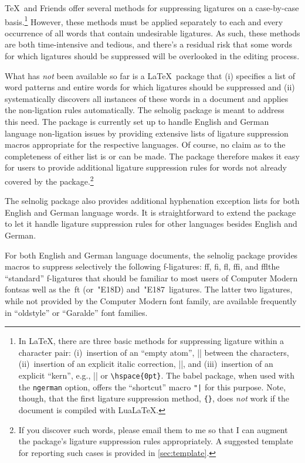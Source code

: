 \documentclass[12pt]{article}
\newcommand{\pkg}[1]{\textsf{#1}}
\newcommand{\opt}[1]{\texttt{#1}}
\begin{document}
\TeX\ and Friends offer several methods for suppressing ligatures on a case-by-case basis.\footnote{In \LaTeX, there are three basic methods for suppressing ligature within a character pair: (i)~insertion of an \enquote{empty atom}, |{}| between the characters, (ii)~insertion of an explicit italic correction, |\/|, and (iii)~insertion of an explicit \enquote{kern}, e.g., |\kern0pt| or \Verb/\hspace{0pt}/. The \pkg{babel} package, when used with the \opt{ngerman} option, offers the \enquote{shortcut} macro \Verb/"|/ for this purpose. Note, though, that the first ligature suppression method, \Verb/{}/, does \emph{not} work if the document is compiled with Lua\LaTeX.} However, these methods must be applied separately to each and every occurrence of all words that contain undesirable ligatures. As such, these methods are both time-intensive and tedious, and there's a residual risk that some words for which ligatures should be suppressed will be overlooked in the editing process. 

What has \emph{not} been available so far is a \LaTeX\ package that (i) specifies a list of word patterns and entire words for which ligatures should be suppressed and (ii) systematically discovers all instances of these words in a document and applies the non-ligation rules automatically. The \pkg{selnolig} package is meant to address this need. The package is currently set up to handle English and German language non-ligation issues by providing extensive lists of ligature suppression macros appropriate for the respective languages. Of course, no claim as to the completeness of either list is or can be made. The package therefore makes it easy for users to provide additional ligature suppression rules for words not already covered by the package.\footnote{If you discover such words, please email them to me so that I can augment the package's ligature suppression rules appropriately. A suggested template for reporting such cases is provided in \cref{sec:template}.} 

The \pkg{selnolig} package also provides additional hyphenation exception lists for both English and German language words. It is straightforward to extend the package to let it handle ligature suppression rules for other languages besides English and German. 

For both English and German language documents, the \pkg{selnolig} package provides macros to suppress selectively the following f-ligatures: ff, fi, fl, ffi, and ffl\textemdash the \enquote{standard} f-ligatures that should be familiar to most users of Computer Modern fonts\textemdash as well as the~ft (or~\char"E18D) and~\char"E187\ ligatures. The latter two ligatures, while not provided by the Computer Modern font family, are available frequently in \enquote{oldstyle} or \enquote{Garalde} font families.
\end{document}

